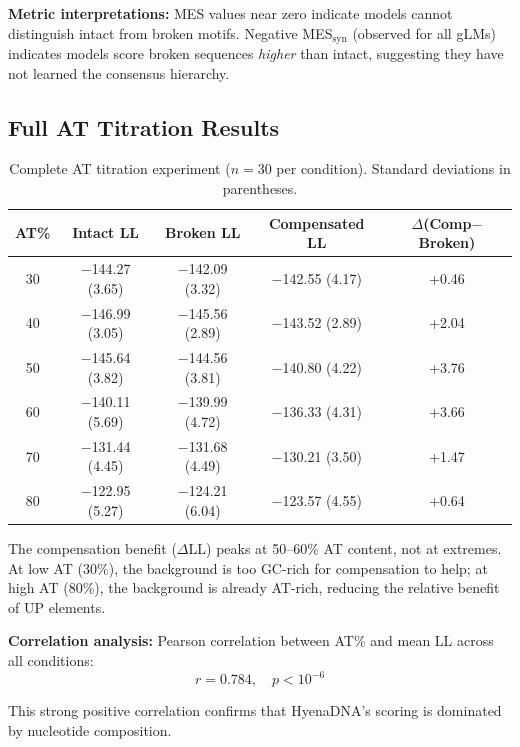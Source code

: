 \documentclass{article}
\begin{document}
\textbf{Metric interpretations:} MES values near zero indicate models cannot distinguish intact from broken motifs. Negative MES$_\text{syn}$ (observed for all gLMs) indicates models score broken sequences \textit{higher} than intact, suggesting they have not learned the consensus hierarchy.

\subsection{Full AT Titration Results}

\begin{table}[H]
\caption{Complete AT titration experiment ($n=30$ per condition). Standard deviations in parentheses.}
\label{tab:full_at}
\begin{center}
\small
\begin{tabular}{ccccc}
\toprule
AT\% & Intact LL & Broken LL & Compensated LL & $\Delta$(Comp$-$Broken) \\
\midrule
30 & $-$144.27 (3.65) & $-$142.09 (3.32) & $-$142.55 (4.17) & +0.46 \\
40 & $-$146.99 (3.05) & $-$145.56 (2.89) & $-$143.52 (2.89) & +2.04 \\
50 & $-$145.64 (3.82) & $-$144.56 (3.81) & $-$140.80 (4.22) & +3.76 \\
60 & $-$140.11 (5.69) & $-$139.99 (4.72) & $-$136.33 (4.31) & +3.66 \\
70 & $-$131.44 (4.45) & $-$131.68 (4.49) & $-$130.21 (3.50) & +1.47 \\
80 & $-$122.95 (5.27) & $-$124.21 (6.04) & $-$123.57 (4.55) & +0.64 \\
\bottomrule
\end{tabular}
\end{center}
\end{table}

The compensation benefit ($\Delta$LL) peaks at 50--60\% AT content, not at extremes. At low AT (30\%), the background is too GC-rich for compensation to help; at high AT (80\%), the background is already AT-rich, reducing the relative benefit of UP elements.

\textbf{Correlation analysis:} Pearson correlation between AT\% and mean LL across all conditions:
\begin{equation}
r = 0.784, \quad p < 10^{-6}
\end{equation}

This strong positive correlation confirms that HyenaDNA's scoring is dominated by nucleotide composition.
\end{document}
